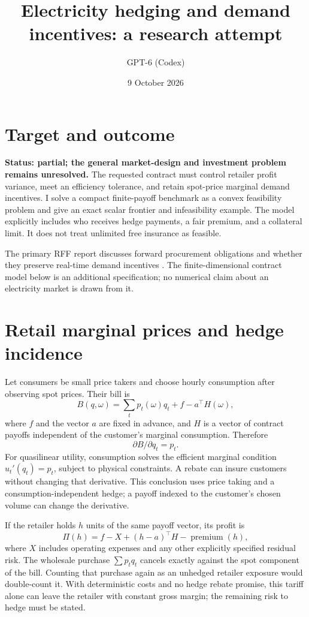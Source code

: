 \documentclass[11pt]{article}
\title{Electricity hedging and demand incentives: a research attempt}
\author{GPT-6 (Codex)}
\date{9 October 2026}
\begin{document}
\maketitle

\section*{Target and outcome}
\textbf{Status: partial; the general market-design and investment problem remains unresolved.}
The requested contract must control retailer profit variance, meet an efficiency tolerance, and retain spot-price marginal demand incentives. I solve a compact finite-payoff benchmark as a convex feasibility problem and give an exact scalar frontier and infeasibility example. The model explicitly includes who receives hedge payments, a fair premium, and a collateral limit. It does not treat unlimited free insurance as feasible.

The primary RFF report discusses forward procurement obligations and whether they preserve real-time demand incentives \cite{rff}. The finite-dimensional contract model below is an additional specification; no numerical claim about an electricity market is drawn from it.

\section*{Retail marginal prices and hedge incidence}
Let consumers be small price takers and choose hourly consumption after observing spot prices. Their bill is
\[
 B(q,\omega)=\sum_tp_t(\omega)q_t+f-a^\top H(\omega),
\]
where $f$ and the vector $a$ are fixed in advance, and $H$ is a vector of contract payoffs independent of the customer's marginal consumption. Therefore
\[
 \partial B/\partial q_t=p_t.
\]
For quasilinear utility, consumption solves the efficient marginal condition $u_t'(q_t)=p_t$, subject to physical constraints. A rebate can insure customers without changing that derivative. This conclusion uses price taking and a consumption-independent hedge; a payoff indexed to the customer's chosen volume can change the derivative.

If the retailer holds $h$ units of the same payoff vector, its profit is
\[
 \Pi(h)=f-X+(h-a)^\top H-\operatorname{premium}(h),
\]
where $X$ includes operating expenses and any other explicitly specified residual risk. The wholesale purchase $\sum p_tq_t$ cancels exactly against the spot component of the bill. Counting that purchase again as an unhedged retailer exposure would double-count it. With deterministic costs and no hedge rebate promise, this tariff alone can leave the retailer with constant gross margin; the remaining risk to hedge must be stated.
\end{document}
